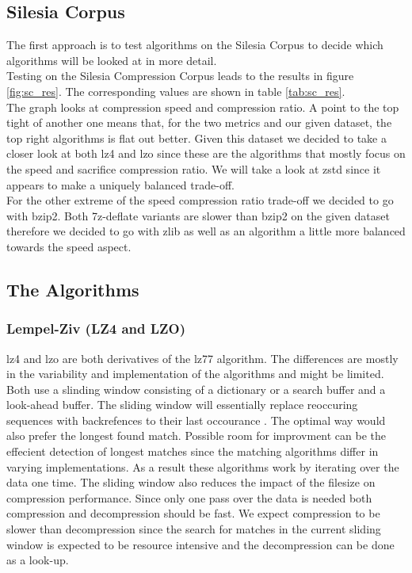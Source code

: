 \documentclass[
	12pt,
	a4paper,
	BCOR10mm,
	DIV14,
	listof=totoc,
	bibliography=totoc,
	headsepline
]{scrreprt}
\begin{document}
\subsection{Silesia Corpus}
The first approach is to test algorithms on the Silesia Corpus to decide which algorithms will be looked at in more detail.
\\
Testing on the Silesia Compression Corpus leads to the results in figure \ref{fig:sc_res}.
The corresponding values are shown in table \ref{tab:sc_res}. \\






The graph looks at compression speed and compression ratio. A point to the top tight of another one means that, for the two metrics and our given dataset, the top right algorithms is flat out better. Given this dataset we decided to take a closer look at both lz4 and lzo since these are the algorithms that mostly focus on the speed and sacrifice compression ratio. We will take a look at zstd since it appears to make a uniquely balanced trade-off. \\
For the other extreme of the speed compression ratio trade-off we decided to go with bzip2. Both 7z-deflate variants are slower than bzip2 on the given dataset therefore we decided to go with zlib as well as an algorithm a little more balanced towards the speed aspect.



\subsection{The Algorithms}
\label{algorithms}

\subsubsection{Lempel-Ziv (LZ4 and LZO)}
lz4 and lzo are both derivatives of the lz77 algorithm. The differences are mostly in the variability and implementation of the algorithms and might be limited.
Both use a slinding window consisting of a dictionary or a search buffer and a look-ahead buffer.
The sliding window will essentially replace reoccuring sequences with backrefences to their last occourance \cite{lz4data}.
The optimal way would also prefer the longest found match.
Possible room for improvment can be the effecient detection of longest matches since the matching algorithms differ in varying implementations.
As a result these algorithms work by iterating over the data one time.
The sliding window also reduces the impact of the filesize on compression performance.
Since only one pass over the data is needed both compression and decompression should be fast.
We expect compression to be slower than decompression since the search for matches in the current sliding window is expected to be resource intensive and the decompression can be done as a look-up.
\end{document}
